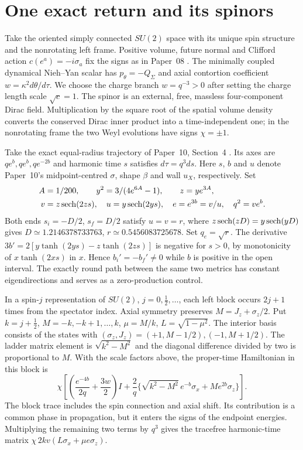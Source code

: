 \section{One exact return and its spinors}\label{sec:02}
Take the oriented simply connected $SU(2)$ space with its unique spin structure and the nonrotating left frame. Positive volume, future normal and Clifford action $c(e^a)=-i\sigma_a$ fix the signs as in Paper~08 \cite{paper8}. The minimally coupled dynamical Nieh--Yan scalar has $p_\theta=-Q_\Sigma$ and axial contortion coefficient $w=\kappa^2d\theta/d\tau$. We choose the charge branch $w=q^{-3}>0$ after setting the charge length scale $\sqrt c=1$. The spinor is an external, free, massless four-component Dirac field. Multiplication by the square root of the spatial volume density converts the conserved Dirac inner product into a time-independent one; in the nonrotating frame the two Weyl evolutions have signs $\chi=\pm1$.

Take the exact equal-radius trajectory of Paper~10, Section~4 \cite{paper10}. Its axes are $qe^b,qe^b,qe^{-2b}$ and harmonic time $s$ satisfies $d\tau=q^3 ds$. Here $s$, $b$ and $u$ denote Paper~10's midpoint-centred $\sigma$, shape $\beta$ and wall $u_X$, respectively. Set
\begin{align}
 A&=1/200,\qquad y^2=3/(4e^{6A}-1),\qquad z=ye^{3A},\nonumber\\
 v&=z\operatorname{sech}(2zs),\quad u=y\operatorname{sech}(2ys),\quad e=e^{3b}=v/u,\quad q^2=ve^b . \label{eq:exact}
\end{align}
Both ends $s_i=-D/2$, $s_f=D/2$ satisfy $u=v=r$, where $z\operatorname{sech}(zD)=y\operatorname{sech}(yD)$ gives $D\simeq1.2146378733763$, $r\simeq0.5456083725678$. Set $q_e=\sqrt r$. The derivative $3b'=2[y\tanh(2ys)-z\tanh(2zs)]$ is negative for $s>0$, by monotonicity of $x\tanh(2xs)$ in $x$. Hence $b_i'=-b_f'\ne0$ while $b$ is positive in the open interval. The exactly round path between the same two metrics has constant eigendirections and serves as a zero-production control.

In a spin-$j$ representation of $SU(2)$, $j=0,\tfrac12,\ldots$, each left block occurs $2j+1$ times from the spectator index. Axial symmetry preserves $M=J_z+\sigma_z/2$. Put $k=j+\tfrac12$, $M=-k,-k+1,\ldots,k$, $\mu=M/k$, $L=\sqrt{1-\mu^2}$. The interior basis consists of the states with $(\sigma_z,J_z)=(+1,M-1/2),(-1,M+1/2)$. The ladder matrix element is $\sqrt{k^2-M^2}$ and the diagonal difference divided by two is proportional to $M$. With the scale factors above, the proper-time Hamiltonian in this block is
\begin{equation}
 \chi\left[\left(\frac{e^{-4b}}{2q}+\frac{3w}2\right)I+
 \frac2q\{\sqrt{k^2-M^2}\,e^{-b}\sigma_x+M e^{2b}\sigma_z\}\right].
 \label{eq:physical}
\end{equation}
The block trace includes the spin connection and axial shift. Its contribution is a common phase in propagation, but it enters the signs of the endpoint energies. Multiplying the remaining two terms by $q^3$ gives the tracefree harmonic-time matrix $\chi\,2kv(L\sigma_x+\mu e\sigma_z)$.


